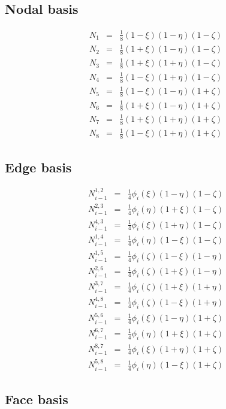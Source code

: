 \subsection{Nodal basis}

\begin{eqnarray*}
N_1&=&\frac{1}{8}(1-\xi)(1-\eta)(1-\zeta) \\
N_2&=&\frac{1}{8}(1+\xi)(1-\eta)(1-\zeta) \\
N_3&=&\frac{1}{8}(1+\xi)(1+\eta)(1-\zeta) \\
N_4&=&\frac{1}{8}(1-\xi)(1+\eta)(1-\zeta) \\
N_5&=&\frac{1}{8}(1-\xi)(1-\eta)(1+\zeta) \\
N_6&=&\frac{1}{8}(1+\xi)(1-\eta)(1+\zeta) \\
N_7&=&\frac{1}{8}(1+\xi)(1+\eta)(1+\zeta) \\
N_8&=&\frac{1}{8}(1-\xi)(1+\eta)(1+\zeta)
\end{eqnarray*}

\subsection{Edge basis}
 
\begin{eqnarray*}
N_{i-1}^{1,2}&=&\frac{1}{4}\phi_i(\xi)(1-\eta)(1-\zeta) \\
N_{i-1}^{2,3}&=&\frac{1}{4}\phi_i(\eta)(1+\xi)(1-\zeta) \\
N_{i-1}^{4,3}&=&\frac{1}{4}\phi_i(\xi)(1+\eta)(1-\zeta) \\
N_{i-1}^{1,4}&=&\frac{1}{4}\phi_i(\eta)(1-\xi)(1-\zeta) \\
N_{i-1}^{1,5}&=&\frac{1}{4}\phi_i(\zeta)(1-\xi)(1-\eta) \\
N_{i-1}^{2,6}&=&\frac{1}{4}\phi_i(\zeta)(1+\xi)(1-\eta) \\
N_{i-1}^{3,7}&=&\frac{1}{4}\phi_i(\zeta)(1+\xi)(1+\eta) \\
N_{i-1}^{4,8}&=&\frac{1}{4}\phi_i(\zeta)(1-\xi)(1+\eta) \\
N_{i-1}^{5,6}&=&\frac{1}{4}\phi_i(\xi)(1-\eta)(1+\zeta) \\
N_{i-1}^{6,7}&=&\frac{1}{4}\phi_i(\eta)(1+\xi)(1+\zeta) \\
N_{i-1}^{8,7}&=&\frac{1}{4}\phi_i(\xi)(1+\eta)(1+\zeta) \\
N_{i-1}^{5,8}&=&\frac{1}{4}\phi_i(\eta)(1-\xi)(1+\zeta)
\end{eqnarray*}

\subsection{Face basis}

